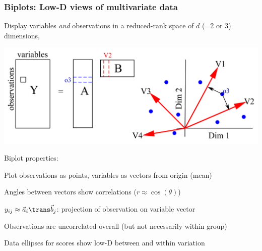 \renewcommand{\FileName}{biplot2}

\begin{frame}
  \frametitle{Biplots: Low-D views of multivariate data}
  \begin{itemize*}
    \item Display variables \emph{and} observations in a reduced-rank space of $d$ (=2 or 3) dimensions,
%	
%	
  \begin{center}
	\includegraphics[width=.7\textwidth,clip]{fig/biplotdemo}
  \end{center}

%
	\item Biplot properties:
  	\begin{itemize*}
	\item Plot observations as points, variables as vectors from origin (mean)
	\item Angles between vectors show correlations ($r \approx \cos (\theta)$)
	\item $y_{ij} \approx \vec{a}_i \trans \vec{b}_j$: projection of observation on variable vector
	\item Observations are uncorrelated overall (but not necessarily within group)
	\item Data ellipses for scores show low-D between and within variation
  	\end{itemize*}

  \end{itemize*}
\end{frame}


